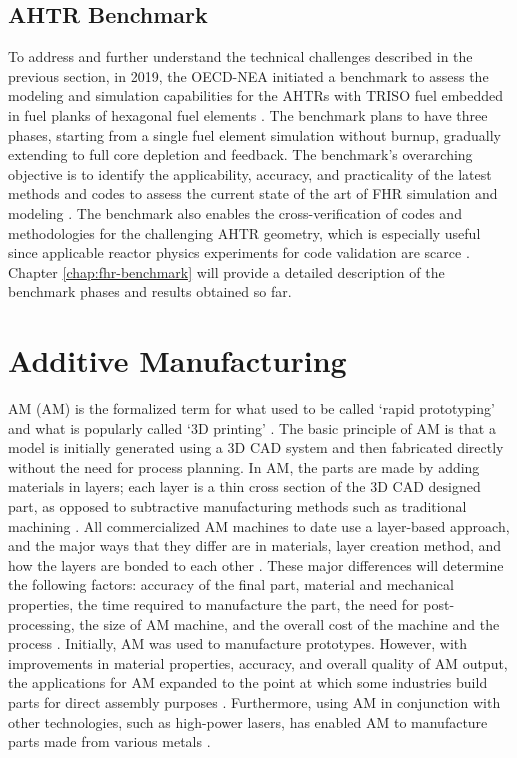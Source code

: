 \subsection{AHTR Benchmark}
To address and further understand the technical challenges described 
in the previous section, in 2019, the OECD-NEA initiated a benchmark to assess the 
modeling and simulation capabilities for the \glspl{AHTR} with 
\gls{TRISO} fuel embedded in fuel planks of hexagonal fuel elements
\cite{noauthor_fluoride_nodate}. 
The benchmark plans to have three phases, starting from a single fuel element 
simulation without burnup, gradually extending to full core depletion and feedback. 
The benchmark's overarching objective is to identify the applicability, accuracy, 
and practicality of the latest methods and codes to assess the current state 
of the art of FHR simulation and modeling \cite{petrovic_preliminary_2021}. 
The benchmark also enables the cross-verification of codes and methodologies 
for the challenging \gls{AHTR} geometry, which is especially useful since 
applicable reactor physics experiments for code validation are scarce 
\cite{petrovic_fhrahtr_2019,petrovic_preliminary_2021}. 
Chapter \ref{chap:fhr-benchmark} will provide a detailed description of the 
benchmark phases and results obtained so far.

\section{Additive Manufacturing}
\acrlong{AM} (AM) is the formalized term for what used to be called `rapid prototyping' 
and what is popularly called `3D printing' \cite{gibson_additive_2014}. 
The basic principle of \gls{AM} is that a model is initially generated using a
\gls{3D CAD} system and then fabricated directly without the need for process 
planning. 
In \gls{AM}, the parts are made by adding materials in layers; each layer is a 
thin cross section of the \gls{3D CAD} designed part, as opposed 
to subtractive manufacturing methods such as traditional machining
\cite{standard_standard_2012}. 
All commercialized \gls{AM} machines to date use a layer-based approach, and 
the major ways that they differ are in materials, layer creation method, and 
how the layers are bonded to each other \cite{gibson_additive_2014}.
These major differences will determine the following factors: accuracy of the 
final part, material and mechanical properties, the time required to manufacture 
the part, the need for post-processing, the size of \gls{AM} machine, and the overall 
cost of the machine and the process \cite{gibson_additive_2014}. 
Initially, \gls{AM} was used to manufacture prototypes. 
However, with improvements in material properties, accuracy, and overall quality 
of \gls{AM} output, the applications for \gls{AM} expanded to the 
point at which some industries build parts for direct assembly purposes
\cite{uriondo_present_2015}.  
Furthermore, using \gls{AM} in conjunction with other technologies, such as 
high-power lasers, has enabled \gls{AM} to manufacture parts made from various 
metals \cite{gibson_additive_2014}. 

